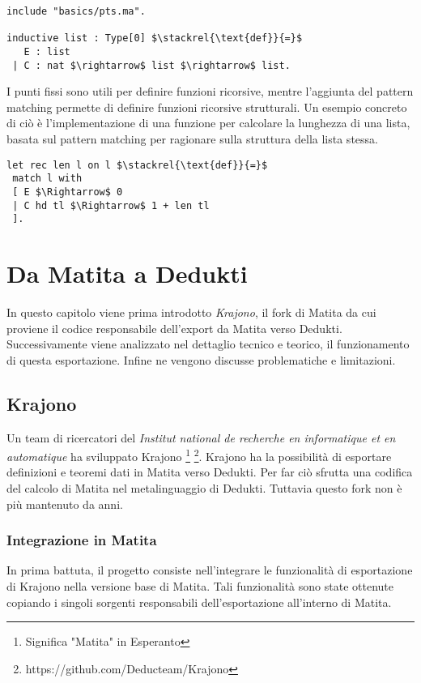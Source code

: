 \documentclass[12pt,a4paper]{mimosis}
\begin{document}
\begin{lstlisting}[mathescape]
include "basics/pts.ma".

inductive list : Type[0] $\stackrel{\text{def}}{=}$
   E : list
 | C : nat $\rightarrow$ list $\rightarrow$ list.

\end{lstlisting}

I punti fissi sono utili per definire funzioni ricorsive, mentre l'aggiunta del
pattern matching permette di definire funzioni ricorsive strutturali. Un esempio
concreto di ciò è l'implementazione di una funzione per calcolare la lunghezza
di una lista, basata sul pattern matching per ragionare sulla struttura della 
lista stessa.

\begin{lstlisting}
let rec len l on l $\stackrel{\text{def}}{=}$
 match l with
 [ E $\Rightarrow$ 0
 | C hd tl $\Rightarrow$ 1 + len tl
 ].
\end{lstlisting}


\chapter{Da Matita a Dedukti} \label{capitoloExport}
In questo capitolo viene prima introdotto \textit{Krajono}, il fork di Matita
da cui proviene il codice responsabile dell'export da Matita verso Dedukti. 
Successivamente viene analizzato nel dettaglio tecnico e teorico, il funzionamento 
di questa esportazione. Infine ne vengono discusse problematiche e limitazioni.

\section{Krajono}
Un team di ricercatori del \textit{Institut national de recherche en informatique 
et en automatique} ha sviluppato Krajono \footnote{Significa "Matita" in Esperanto}
\footnote{https://github.com/Deducteam/Krajono}. Krajono ha la possibilità
di esportare definizioni e teoremi dati in Matita verso Dedukti. Per far ciò
sfrutta una codifica del calcolo di Matita nel metalinguaggio di Dedukti. 
Tuttavia questo fork non è più mantenuto da anni.

\subsection{Integrazione in Matita}
In prima battuta, il progetto consiste nell'integrare le funzionalità di 
esportazione di Krajono nella versione base di Matita. Tali funzionalità sono
state ottenute copiando i singoli sorgenti responsabili dell'esportazione 
all'interno di Matita.
\end{document}
